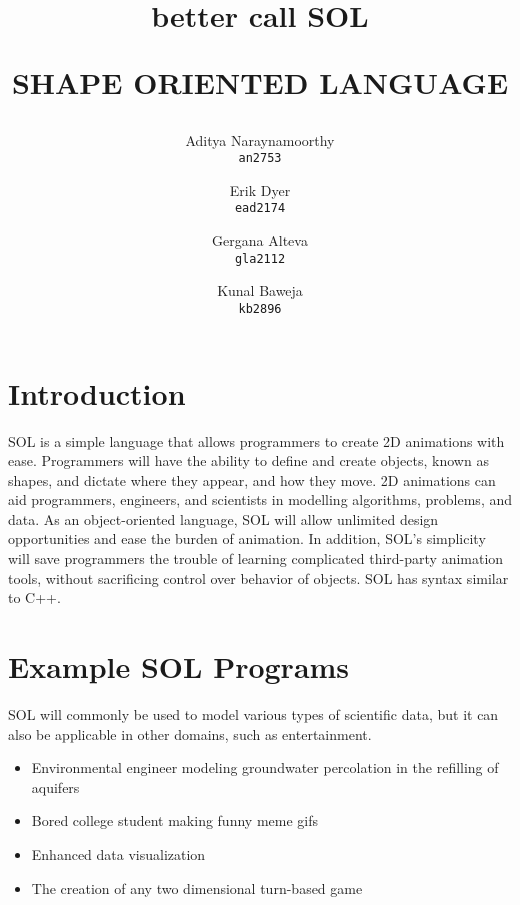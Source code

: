 \documentclass[letterpaper,12pt]{article}
\begin{document}

\title{{\small better call} {\Huge \textbf{SOL}}\\
    \begin{center}{SHAPE ORIENTED LANGUAGE}\end{center}
}


\author{Aditya Naraynamoorthy\\
    \texttt{an2753}
    \and
    Erik Dyer\\
    \texttt{ead2174}
    \and
    Gergana Alteva\\
    \texttt{gla2112}
    \and
    Kunal Baweja\\
    \texttt{kb2896}}

\maketitle

\section*{Introduction}
SOL is a simple language that allows programmers to create 2D animations with ease. Programmers will have the ability to define and create objects, known as shapes, and dictate where they appear, and how they move. 2D animations can aid programmers, engineers, and scientists in modelling algorithms, problems, and data. As an object-oriented language, SOL will allow unlimited design opportunities and ease the burden of animation. In addition, SOL’s simplicity will save programmers the trouble of learning complicated third-party animation tools, without sacrificing control over behavior of objects. SOL has syntax similar to C++.
\par


\section*{Example SOL Programs}

SOL will commonly be used to model various types of scientific data, but it can also be applicable in other domains, such as entertainment.

\begin{itemize}
\itemsep0em 
\item Environmental engineer modeling groundwater percolation in the refilling of aquifers
\item Bored college student making funny meme gifs
\item Enhanced data visualization
\item The creation of any two dimensional turn-based game
\end{itemize}
\end{document}
